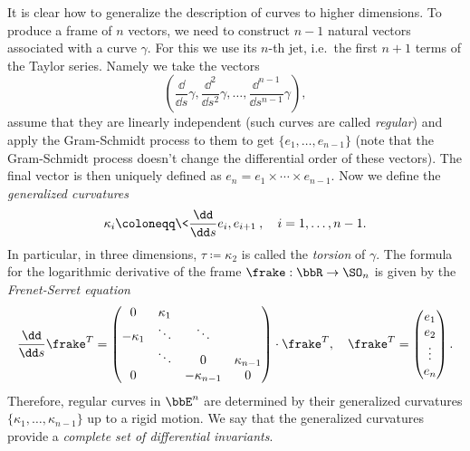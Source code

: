 \begin{example}\label{ex serret-frenet}
    It is clear how to generalize the description of curves to higher dimensions. To produce a frame of $n$ vectors, we need to construct $n-1$ natural vectors associated with a curve $\gamma$. For this we use its $n$-th jet, i.e.\ the first $n+1$ terms of the Taylor series. Namely we take the vectors 
    \[\left(\frac{\dd}{\dd s}\gamma,\frac{\dd^2}{\dd s^2}\gamma,\ldots,\frac{\dd^{n-1}}{\dd s^{n-1}}\gamma\right),\] assume that they are linearly independent (such curves are called \emph{regular}) and apply the Gram-Schmidt process to them to get $\{e_1,\ldots,e_{n-1}\}$ (note that the Gram-Schmidt process doesn't change the differential order of these vectors). The final vector is then uniquely defined as $e_n=e_1\times\cdots\times e_{n-1}$. Now we define the \emph{generalized curvatures}
    \[\kappa_i\coloneqq \<\frac{\dd}{\dd s}e_i,e_{i+1}\>,\quad i=1,\ldots,n-1.\] 
    In particular, in three dimensions, $\tau\coloneqq \kappa_2$ is called the \emph{torsion} of $\gamma$. The formula for the logarithmic derivative of the frame $\frake:\bbR\to \SO_n$ is given by the \emph{Frenet-Serret equation}
    \[\frac{\dd}{\dd s}\frake^T=\begin{pmatrix}
        0 & \kappa_1 & &\\
        -\kappa_1 &\ddots & \ddots&\\
         & \ddots &0 &\kappa_{n-1}\\
         0 & &-\kappa_{n-1} & 0
    \end{pmatrix}\cdot \frake^T,\quad 
    \frake^T=\begin{pmatrix}
        e_1 \\e_2 \\ \vdots \\ e_n
    \end{pmatrix}.
    \]
    Therefore, regular curves in $\bbE^n$ are determined by their generalized curvatures $\{\kappa_1,\ldots,\kappa_{n-1}\}$ up to a rigid motion. We say that the generalized curvatures provide a \emph{complete set of differential invariants}.
\end{example}

